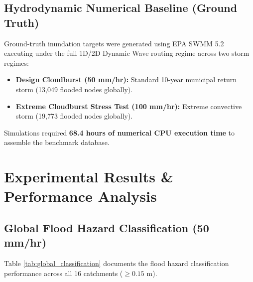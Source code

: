 \documentclass[conference]{IEEEtran}
\begin{document}
\subsection{Hydrodynamic Numerical Baseline (Ground Truth)}
Ground-truth inundation targets were generated using EPA SWMM 5.2 executing under the full 1D/2D Dynamic Wave routing regime across two storm regimes:
\begin{itemize}
    \item \textbf{Design Cloudburst (50 mm/hr):} Standard 10-year municipal return storm (13,049 flooded nodes globally).
    \item \textbf{Extreme Cloudburst Stress Test (100 mm/hr):} Extreme convective storm (19,773 flooded nodes globally).
\end{itemize}
Simulations required \textbf{68.4 hours of numerical CPU execution time} to assemble the benchmark database.

\section{Experimental Results \& Performance Analysis}

\subsection{Global Flood Hazard Classification (50 mm/hr)}
Table \ref{tab:global_classification} documents the flood hazard classification performance across all 16 catchments ($\ge 0.15\text{ m}$).
\end{document}
